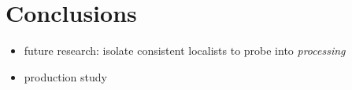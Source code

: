 \documentclass[fleqn,reqno,10pt,draft]{article}
\newcommand{\as}{\acro{as}}
\renewcommand{\es}{\acro{es}}
\begin{document}



\section{Conclusions}
\label{sec:conclusions}

\begin{itemize}
\item future research: isolate consistent localists to probe into \emph{processing}
\item production study
\end{itemize}
\end{document}
